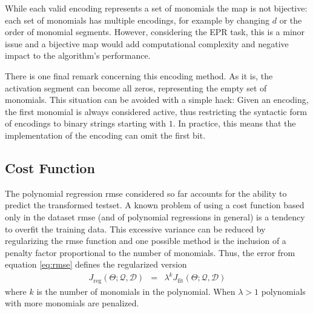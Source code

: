 \documentclass[preprint,authoryear,12pt]{elsarticle}
\begin{document}
While each valid encoding represents a set of monomials the map is not bijective: each set of monomials has multiple encodings, for example by changing $d$ or the order of monomial segments. However, considering the \ac{EPR} task, this is a minor issue and a bijective map would add computational complexity and negative impact to the algorithm's performance.

There is one final remark concerning this encoding method. As it is, the activation segment can become all zeros, representing the empty set of monomials. This situation can be avoided with a simple hack: Given an encoding, the first monomial is always considered active, thus restricting the syntactic form of encodings to binary strings starting with $1$. In practice, this means that the implementation of the encoding can omit the first bit.

\subsection{Cost Function}\label{subs:cost.function}

The polynomial regression \ac{rmse} considered so far accounts for the ability to predict the transformed testset. A known problem of using a cost function based only in the dataset \ac{rmse} (and of polynomial regressions in general) is a tendency to overfit the training data. This excessive variance can be reduced by regularizing the \ac{rmse} function and one possible method is the inclusion of a penalty factor proportional to the number of monomials. Thus, the error from equation \ref{eq:rmse} defines the regularized version
\begin{eqnarray}
J_{\textrm{reg}}\left(\Theta;\mathcal{Q},\mathcal{D}\right) &=& \lambda^{k} J_{\textrm{fit}}\left(\Theta;\mathcal{Q},\mathcal{D}\right)\label{eq:rmse-reg}
\end{eqnarray}
%
where $k$ is the number of monomials in the polynomial. When $\lambda > 1$ polynomials with more monomials are penalized.
\end{document}
